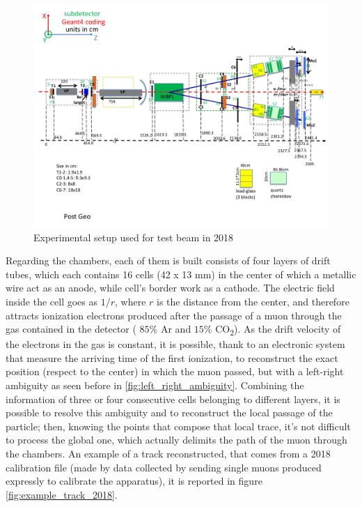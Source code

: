 \documentclass[a4paper,11pt]{book}
\begin{document}
\begin{figure}[hbtp]
\centering
\includegraphics[width=\textwidth,height=0.4\textheight]{pictures/lemma_2018.pdf}
\caption{Experimental setup used for test beam in 2018}
\label{fig:lemma_test_beam_2018}
\end{figure}
 Regarding the chambers, each of them is built consists of four layers of drift tubes, which each contains 16 cells (42 x 13 mm) in the center of which a metallic wire act as an anode, while cell's border work as a cathode. The electric field inside the cell goes as $1/r$, where $r$ is the distance from the center, and therefore attracts ionization electrons produced after the passage of a muon through the gas contained in the detector ( $85\%$ Ar and $15\%$ CO\textsubscript{2}). As the drift velocity of the electrons in the gas is constant, it is possible, thank to an electronic system that measure the arriving time of the first ionization, to reconstruct the exact position (respect to the center) in which the muon passed, but with a left-right ambiguity as seen before in \ref{fig:left_right_ambiguity}. Combining the information of three or four consecutive cells belonging to different layers, it is possible to resolve this ambiguity and to reconstruct the local passage of the particle; then, knowing the points that compose that local trace, it's not difficult to process the global one, which actually delimits the path of the muon through the chambers. An example of a track reconstructed, that comes from a 2018 calibration file (made by data collected by sending single muons produced expressly to calibrate the apparatus), it is reported in figure \ref{fig:example_track_2018}.\\
\end{document}

